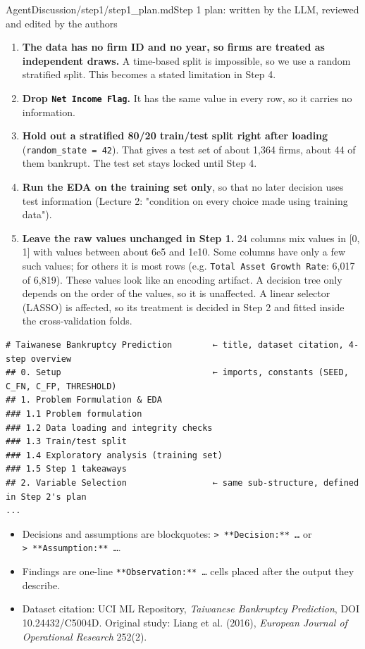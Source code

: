 \begin{mdfile}{AgentDiscussion/\allowbreak{}step1/\allowbreak{}step1\_plan.md}{Step 1 plan: written by the LLM, reviewed and edited by the authors}

\begin{enumerate}
\def\labelenumi{\arabic{enumi}.}
\tightlist
\item
  \textbf{The data has no firm ID and no year, so firms are treated as independent draws.} A time-based split is impossible, so we use a random stratified split. This becomes a stated limitation in Step 4.
\item
  \textbf{Drop \texttt{Net\ Income\ Flag}.} It has the same value in every row, so it carries no information.
\item
  \textbf{Hold out a stratified 80/20 train/test split right after loading} (\texttt{random\_state\ =\ 42}). That gives a test set of about 1,364 firms, about 44 of them bankrupt. The test set stays locked until Step 4.
\item
  \textbf{Run the EDA on the training set only}, so that no later decision uses test information (Lecture 2: "condition on every choice made using training data").
\item
  \textbf{Leave the raw values unchanged in Step 1.} 24 columns mix values in {[}0, 1{]} with values between about 6e5 and 1e10. Some columns have only a few such values; for others it is most rows (e.g. \texttt{Total\ Asset\ Growth\ Rate}: 6,017 of 6,819). These values look like an encoding artifact. A decision tree only depends on the order of the values, so it is unaffected. A linear selector (LASSO) is affected, so its treatment is decided in Step 2 and fitted inside the cross-validation folds.
\end{enumerate}


\begin{Verbatim}[breaklines, fontsize=\footnotesize]
# Taiwanese Bankruptcy Prediction        ← title, dataset citation, 4-step overview
## 0. Setup                              ← imports, constants (SEED, C_FN, C_FP, THRESHOLD)
## 1. Problem Formulation & EDA
### 1.1 Problem formulation
### 1.2 Data loading and integrity checks
### 1.3 Train/test split
### 1.4 Exploratory analysis (training set)
### 1.5 Step 1 takeaways
## 2. Variable Selection                 ← same sub-structure, defined in Step 2's plan
...
\end{Verbatim}

\begin{itemize}
\tightlist
\item
  Decisions and assumptions are blockquotes: \texttt{\textgreater{}\ **Decision:**\ …} or \texttt{\textgreater{}\ **Assumption:**\ …}.
\item
  Findings are one-line \texttt{**Observation:**\ …} cells placed after the output they describe.
\item
  Dataset citation: UCI ML Repository, \emph{Taiwanese Bankruptcy Prediction}, DOI 10.24432/C5004D. Original study: Liang et al. (2016), \emph{European Journal of Operational Research} 252(2).
\end{itemize}


\end{mdfile}
